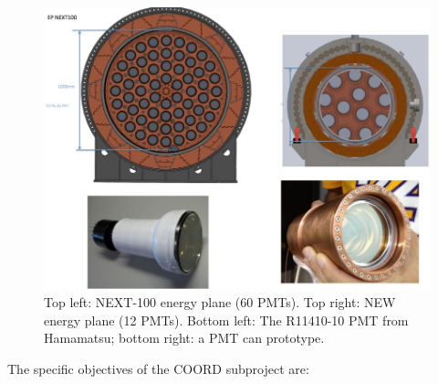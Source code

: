 \begin{figure}[t!b!]
\begin{center}
\includegraphics[width=.9\textwidth]{img/EP.jpg}
\end{center}
\caption{Top left: NEXT-100 energy plane (60 PMTs). Top right: NEW energy plane (12 PMTs).
Bottom left: The R11410-10 PMT from Hamamatsu; bottom right: a PMT can prototype.} \label{fig:EnergyPlane}
\end{figure}




The specific objectives of the COORD subproject are:

